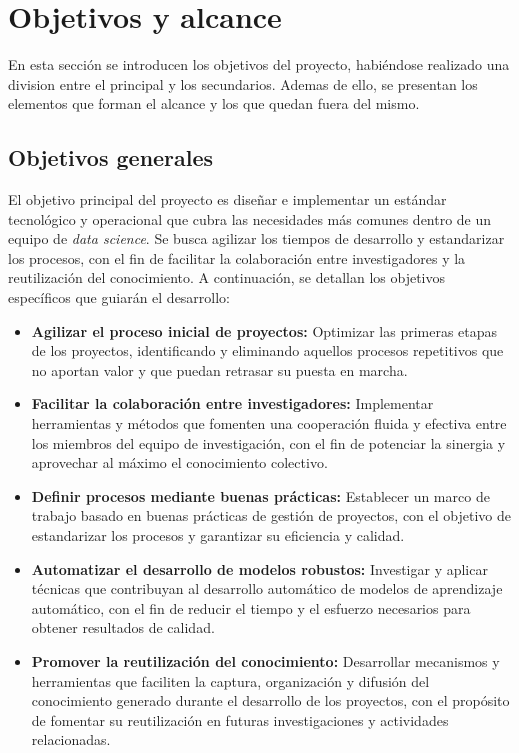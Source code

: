 \section{Objetivos y alcance}
En esta sección se introducen los objetivos del 
proyecto, habiéndose realizado una division entre el principal y los
secundarios. Ademas de ello, se presentan los elementos que forman el alcance
y los que quedan fuera del mismo.

\subsection{Objetivos generales}
El objetivo principal del proyecto es diseñar e implementar un estándar tecnológico y 
operacional que cubra las necesidades más comunes dentro de un equipo de \textit{data science}. Se 
busca agilizar los tiempos de desarrollo y estandarizar los procesos, con el fin de
facilitar la colaboración entre investigadores y la reutilización del conocimiento. A
continuación, se detallan los objetivos específicos que guiarán el desarrollo:

\begin{itemize}
    \item \textbf{Agilizar el proceso inicial de proyectos:} Optimizar las primeras etapas 
    de los proyectos, identificando y eliminando aquellos procesos repetitivos que no aportan
    valor y que puedan retrasar su puesta en marcha. 
    \item \textbf{Facilitar la colaboración entre investigadores:} Implementar herramientas y 
    métodos que fomenten una cooperación fluida y efectiva entre los miembros del equipo de 
    investigación, con el fin de potenciar la sinergia y aprovechar al máximo el conocimiento 
    colectivo.
    \item \textbf{Definir procesos mediante buenas prácticas:} Establecer un marco de trabajo 
    basado en buenas prácticas de gestión de proyectos, con el objetivo de estandarizar los 
    procesos y garantizar su eficiencia y calidad.
    \item \textbf{Automatizar el desarrollo de modelos robustos:} Investigar y aplicar 
    técnicas que contribuyan al desarrollo automático de modelos de aprendizaje automático,
    con el fin de reducir el tiempo y el esfuerzo necesarios para obtener resultados de calidad.
    \item \textbf{Promover la reutilización del conocimiento:} Desarrollar mecanismos y herramientas 
    que faciliten la captura, organización y difusión del conocimiento generado durante el desarrollo 
    de los proyectos, con el propósito de fomentar su reutilización en futuras investigaciones y 
    actividades relacionadas.
\end{itemize}

